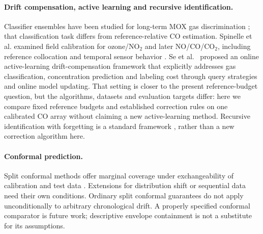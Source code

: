 \paragraph{Drift compensation, active learning and recursive identification.}
Classifier ensembles have been studied for long-term MOX gas discrimination \cite{vergara2012}; that classification task differs from reference-relative CO estimation. Spinelle et al. examined field calibration for ozone/NO$_2$ and later NO/CO/CO$_2$, including reference collocation and temporal sensor behavior \cite{spinelle2015,spinelle2017}. Se et al.~\cite{se2024} proposed an online active-learning drift-compensation framework that explicitly addresses gas classification, concentration prediction and labeling cost through query strategies and online model updating. That setting is closer to the present reference-budget question, but the algorithms, datasets and evaluation targets differ: here we compare fixed reference budgets and established correction rules on one calibrated CO array without claiming a new active-learning method. Recursive identification with forgetting is a standard framework \cite{ljung1983}, rather than a new correction algorithm here.

\paragraph{Conformal prediction.}
Split conformal methods offer marginal coverage under exchangeability of calibration and test data \cite{angelopoulos2021}. Extensions for distribution shift or sequential data need their own conditions. Ordinary split conformal guarantees do not apply unconditionally to arbitrary chronological drift. A properly specified conformal comparator is future work; descriptive envelope containment is not a substitute for its assumptions.

